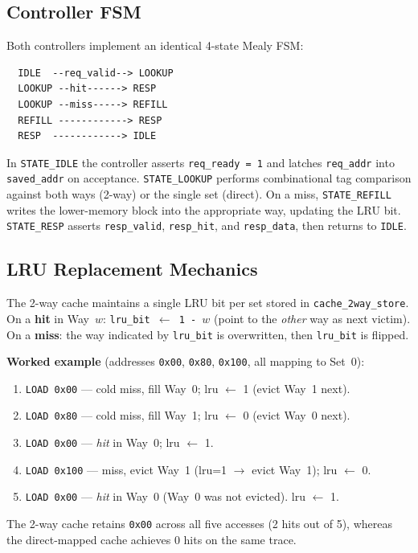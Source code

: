 \documentclass[conference]{IEEEtran}
\begin{document}
\subsection{Controller FSM}
\label{subsec:fsm}

Both controllers implement an identical 4-state Mealy FSM:

\begin{verbatim}
  IDLE  --req_valid--> LOOKUP
  LOOKUP --hit------> RESP
  LOOKUP --miss-----> REFILL
  REFILL ------------> RESP
  RESP  ------------> IDLE
\end{verbatim}

\noindent
In {\tt STATE\_IDLE} the controller asserts {\tt req\_ready = 1} and
latches {\tt req\_addr} into {\tt saved\_addr} on acceptance.
{\tt STATE\_LOOKUP} performs combinational tag comparison against both
ways (2-way) or the single set (direct).
On a miss, {\tt STATE\_REFILL} writes the lower-memory block into the
appropriate way, updating the LRU bit.
{\tt STATE\_RESP} asserts {\tt resp\_valid}, {\tt resp\_hit}, and
{\tt resp\_data}, then returns to {\tt IDLE}.

\subsection{LRU Replacement Mechanics}
\label{subsec:lru}

The 2-way cache maintains a single LRU bit per set stored in
{\tt cache\_2way\_store}.
On a \textbf{hit} in Way~$w$: {\tt lru\_bit $\leftarrow$ 1 - $w$}
(point to the \emph{other} way as next victim).
On a \textbf{miss}: the way indicated by {\tt lru\_bit} is overwritten,
then {\tt lru\_bit} is flipped.

\textbf{Worked example} (addresses {\tt 0x00}, {\tt 0x80}, {\tt 0x100},
all mapping to Set~0):
\begin{enumerate}
  \item {\tt LOAD 0x00} — cold miss, fill Way~0; lru $\leftarrow$ 1 (evict Way~1 next).
  \item {\tt LOAD 0x80} — cold miss, fill Way~1; lru $\leftarrow$ 0 (evict Way~0 next).
  \item {\tt LOAD 0x00} — \emph{hit} in Way~0; lru $\leftarrow$ 1.
  \item {\tt LOAD 0x100} — miss, evict Way~1 (lru=1 $\rightarrow$ evict Way~1);
        lru $\leftarrow$ 0.
  \item {\tt LOAD 0x00} — \emph{hit} in Way~0 (Way~0 was not evicted). lru $\leftarrow$ 1.
\end{enumerate}
The 2-way cache retains {\tt 0x00} across all five accesses (2 hits out
of 5), whereas the direct-mapped cache achieves 0 hits on the same trace.
\end{document}
